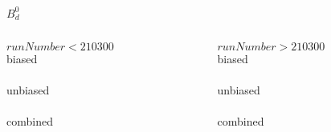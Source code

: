 \begin{frame}{$B_d^0$}
  
  \begin{columns}
  
    \begin{column}{0.45\textwidth}
    $runNumber<210300$\\[3mm]
    {biased} \\[2mm]
    \resizebox{\textwidth}{!}{}\\[5mm]
    {unbiased} \\[2mm]
    \resizebox{\textwidth}{!}{}\\[5mm]
    {combined} \\[2mm]
    \resizebox{\textwidth}{!}{}\\
    \end{column}
  
    \begin{column}{0.45\textwidth}
    $runNumber>210300$\\[3mm]
    {biased} \\[2mm]
    \resizebox{\textwidth}{!}{}\\[5mm]
    {unbiased} \\[2mm]
    \resizebox{\textwidth}{!}{}\\[5mm]
    {combined} \\[2mm]
    \resizebox{\textwidth}{!}{}\\
    \end{column}
  
  \end{columns}

\end{frame}



